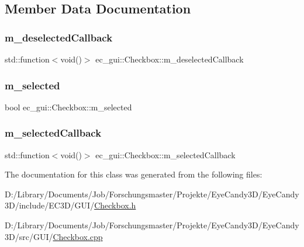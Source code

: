\subsection{Member Data Documentation}
\mbox{\label{classec__gui_1_1_checkbox_a67f81ba535c95503bb2f8b66db35e594}} 
\subsubsection{\texorpdfstring{m\+\_\+deselected\+Callback}{m\_deselectedCallback}}
{\footnotesize\ttfamily std\+::function$<$void()$>$ ec\+\_\+gui\+::\+Checkbox\+::m\+\_\+deselected\+Callback\hspace{0.3cm}{\ttfamily [protected]}}

\mbox{\label{classec__gui_1_1_checkbox_aa5c7879c4d6422bd5c0fd96edc484a88}} 
\subsubsection{\texorpdfstring{m\+\_\+selected}{m\_selected}}
{\footnotesize\ttfamily bool ec\+\_\+gui\+::\+Checkbox\+::m\+\_\+selected\hspace{0.3cm}{\ttfamily [protected]}}

\mbox{\label{classec__gui_1_1_checkbox_ae1f5d67ca2f0e54930ac1a7fcf39fe05}} 
\subsubsection{\texorpdfstring{m\+\_\+selected\+Callback}{m\_selectedCallback}}
{\footnotesize\ttfamily std\+::function$<$void()$>$ ec\+\_\+gui\+::\+Checkbox\+::m\+\_\+selected\+Callback\hspace{0.3cm}{\ttfamily [protected]}}



The documentation for this class was generated from the following files\+:\begin{DoxyCompactItemize}
\item 
D\+:/\+Library/\+Documents/\+Job/\+Forschungsmaster/\+Projekte/\+Eye\+Candy3\+D/\+Eye\+Candy3\+D/include/\+E\+C3\+D/\+G\+U\+I/\mbox{\hyperlink{_checkbox_8h}{Checkbox.\+h}}\item 
D\+:/\+Library/\+Documents/\+Job/\+Forschungsmaster/\+Projekte/\+Eye\+Candy3\+D/\+Eye\+Candy3\+D/src/\+G\+U\+I/\mbox{\hyperlink{_checkbox_8cpp}{Checkbox.\+cpp}}\end{DoxyCompactItemize}
